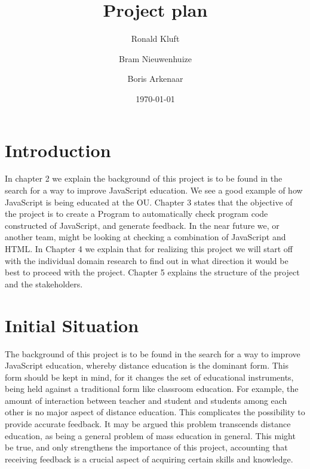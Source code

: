 \documentclass{article}
\begin{document}
 

\title{Project plan}
\author{Ronald Kluft \and Bram Nieuwenhuize \and Boris Arkenaar}
\date{\today}
\maketitle 
\tableofcontents

\section{Introduction} 

In chapter 2 we explain the background of this project is to be found in the 
search for a way to improve JavaScript education. We see a good example of how 
JavaScript is being educated at the OU. Chapter 3 states that the objective of 
the project is to create a Program to automatically check program code 
constructed of JavaScript, and generate feedback. 
In the near future we, or another team, might be 
looking at checking a combination of JavaScript and HTML. In Chapter 4 we 
explain that for realizing this project we will start off with the individual 
domain research to find out in what direction it would be best to proceed with 
the project. Chapter 5 explains the structure of the project and the 
stakeholders. 

\section{Initial Situation} 

The background of this project is to be found in the search for a way to
improve JavaScript education, whereby distance education is the dominant
form. This form should be kept in mind, for it changes the set of educational
instruments, being held against a traditional form like classroom
education. For example, the amount of interaction between teacher and student
and students among each other is no major aspect of distance education. This
complicates the possibility to provide accurate feedback. It may be argued this
problem transcends distance education, as being a general problem of mass
education in general. This might be true, and only strengthens the importance
of this project, accounting that receiving feedback is a crucial aspect of
acquiring certain skills and knowledge.
\end{document}
